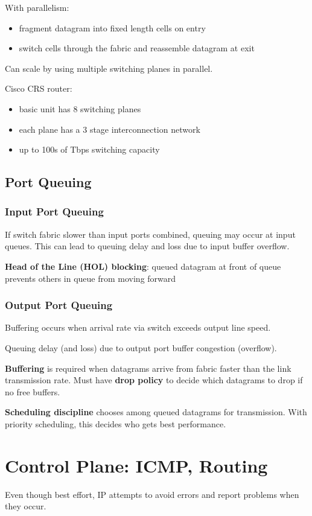 \documentclass[11pt]{article}
\begin{document}
With parallelism:
\begin{itemize}
\item fragment datagram into fixed length cells on entry
\item switch cells through the fabric and reassemble datagram at exit
\end{itemize}

Can scale by using multiple switching planes in parallel.

Cisco CRS router:
\begin{itemize}
\item basic unit has 8 switching planes
\item each plane has a 3 stage interconnection network
\item up to 100s of Tbps switching capacity
\end{itemize}
\subsection{Port Queuing}
\label{sec:orgb539286}
\subsubsection{Input Port Queuing}
\label{sec:org0b84f97}
If switch fabric slower than input ports combined, queuing may occur at input queues.
This can lead to queuing delay and loss due to input buffer overflow.

\textbf{Head of the Line (HOL) blocking}: queued datagram at front of queue prevents others
in queue from moving forward
\subsubsection{Output Port Queuing}
\label{sec:org9cff9ff}
Buffering occurs when arrival rate via switch exceeds output line speed.

Queuing delay (and loss) due to output port buffer congestion (overflow).

\textbf{Buffering} is required when datagrams arrive from fabric faster than the link
transmission rate.
Must have \textbf{drop policy} to decide which datagrams to drop if no free buffers.

\textbf{Scheduling discipline} chooses among queued datagrams for transmission.
With priority scheduling, this decides who gets best performance.
\section{Control Plane: ICMP, Routing}
\label{sec:org9d8bf8d}
Even though best effort, IP attempts to avoid errors and report problems when they
occur.
\end{document}
